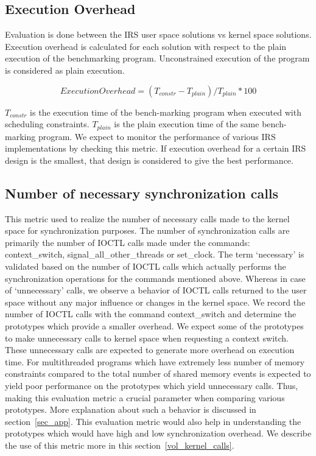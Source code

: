 \subsection{Execution Overhead}

Evaluation is done between the IRS user space solutions vs kernel space solutions. 
Execution overhead is calculated for each solution with respect to the plain execution of the benchmarking program. 
Unconstrained execution of the program is considered as plain execution. 

$$Execution Overhead = (T_{constr} - T_{plain})/T_{plain} * 100$$

$T_{constr}$ is the execution time of the bench-marking program when executed with scheduling constraints. 
$T_{plain}$ is the plain execution time of the same bench-marking program. 
We expect to monitor the performance of various IRS implementations by checking this metric. 
If execution overhead for a certain IRS design is the smallest, that design is considered to give the best performance. 

\subsection{Number of necessary synchronization calls} 

This metric used to realize the number of necessary calls made to the kernel space for synchronization purposes. 
The number of synchronization calls are primarily the number of IOCTL calls made under the commands: context\_switch, signal\_all\_other\_threads or set\_clock. 
The term `necessary' is validated based on the number of IOCTL calls which actually performs the synchronization operations for the commands mentioned above. 
Whereas in case of `unnecessary' calls, we observe a behavior of IOCTL calls returned to the user space without any major influence or changes in the kernel space. 
We record the number of IOCTL calls with the command context\_switch and determine the prototypes which provide a smaller overhead. 
We expect some of the prototypes to make unnecessary calls to kernel space when requesting a context switch. 
These unnecessary calls are expected to generate more overhead on execution time. 
For multithreaded programs which have extremely less number of memory constraints compared to the total number of shared memory events is expected to yield poor performance on the prototypes which yield unnecessary calls. 
Thus, making this evaluation metric a crucial parameter when comparing various prototypes. 
More explanation about such a behavior is discussed in section~\ref{sec_app}. 
This evaluation metric would also help in understanding the prototypes which would have high and low synchronization overhead. 
We describe the use of this metric more in this section~\ref{vol_kernel_calls}.  


